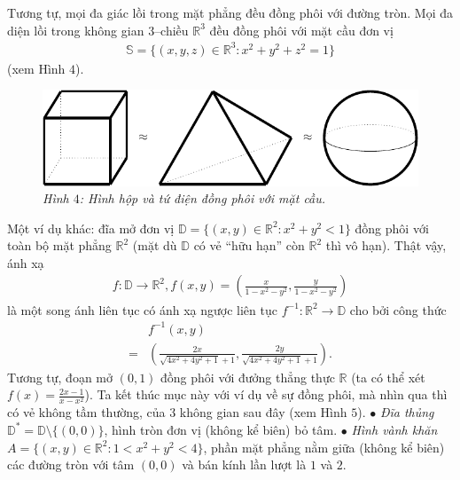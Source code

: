 \begin{multicols}{2}
\begin{figure}[H]
		\vspace*{-10pt}
	\end{figure}
	Tương tự, mọi đa giác lồi trong mặt phẳng đều đồng phôi với đường tròn. Mọi đa diện lồi trong không gian $3$--chiều $\mathbb{R}^3$ đều đồng phôi với mặt cầu đơn vị  
	\begin{align*}
		\mathbb{S} = \{(x,y,z) \in \mathbb{R}^3: x^2 + y^2 + z^2 = 1\}
	\end{align*}
	(xem Hình $4$).
	\begin{figure}[H]
		\vspace*{-5pt}
		\centering\captionsetup{labelformat=empty, justification=centering}
		\includegraphics[width=1\linewidth]{H4.pdf}
		\caption{\small\textit{\color{duongvaotoanhoc}Hình $4$: Hình hộp và tứ điện đồng phôi với mặt cầu.}}
		\vspace*{-10pt}
	\end{figure}
	Một ví dụ khác: đĩa mở đơn vị $\mathbb{D} = \{(x,y) \in \mathbb{R}^2: x^2 + y^2 < 1\}$ đồng phôi với toàn bộ mặt phẳng $\mathbb{R}^2$ (mặt dù $\mathbb{D}$ có vẻ ``hữu hạn'' còn $\mathbb{R}^2$ thì vô hạn). Thật vậy, ánh xạ
	\begin{align*}
		f\!:\! \mathbb{D} \!\to\! \mathbb{R}^2,  f(x,y) \!=\! \left(\!\!\frac{x}{1 \!-\! x^2 \!-\! y^2}, \frac{y}{1 \!-\! x^2 \!-\! y^2}\!\right)
	\end{align*}
	là một song ánh liên tục có ánh xạ ngược liên tục $f^{-1}: \mathbb{R}^2 \to \mathbb{D}$ cho bởi công thức
	\begin{align*}
		&f^{-1}(x,y) \\
		= &\left(\!\frac{2x}{\sqrt{4x^2 \!+\! 4y^2 \!+\! 1} \!+\! 1}, \frac{2y}{\sqrt{4x^2 \!+\! 4y^2 \!+\! 1} \!+\! 1}\!\right).
	\end{align*}
	Tương tự, đoạn mở $(0,1)$ đồng phôi với đưởng thẳng thực $\mathbb{R}$ (ta có thể xét $f(x) = \frac{2x-1}{x - x^2}$).
	\vskip 0.1cm
	Ta kết thúc mục này với ví dụ về sự đồng phôi, mà nhìn qua thì có vẻ không tầm thường, của $3$ không gian sau đây (xem Hình $5$).
	\vskip 0.1cm
	$\bullet$ {\it Đĩa thủng} $\mathbb{D}^\ast = \mathbb{D} \setminus \{(0,0)\}$, hình tròn đơn vị (không kể biên) bỏ tâm.
	\vskip 0.1cm
	$\bullet$ {\it Hình vành khăn} $A = \{(x,y) \in \mathbb{R}^2: 1 < x^2 + y^2 < 4\}$, phần mặt phẳng nằm giữa (không kể biên) các đường tròn với tâm $(0,0)$ và bán kính lần lượt là $1$ và $2$.

\end{multicols}
